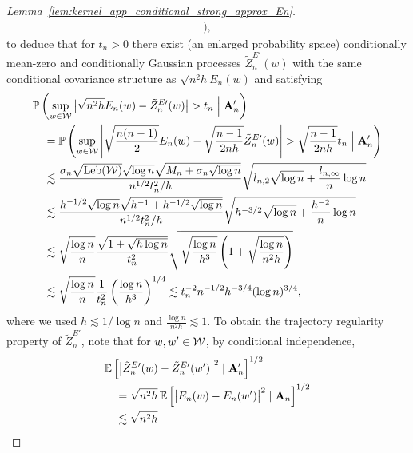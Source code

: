 \begin{proof}[Lemma~\ref{lem:kernel_app_conditional_strong_approx_En}]
\begin{align*}
    \Big),
  \end{align*}
  to deduce that for $t_n > 0$ there exist
  (an enlarged probability space)
  conditionally mean-zero
  and conditionally Gaussian processes
  $\tilde Z_n^{E\prime}(w)$
  with the same conditional covariance structure as
  $\sqrt{n^2 h} E_n(w)$ and
  satisfying
  \begin{align*}
    &\mathbb{P}\left(
      \sup_{w \in \mathcal{W}}
      \big|
      \sqrt{n^2h} E_n(w) - \tilde Z_n^{E\prime}(w)
      \big|
      > t_n
      \Bigm\vert \mathbf{A}_n'
    \right) \\
    &\quad=
    \mathbb{P}\left(
      \sup_{w \in \mathcal{W}}
      \left|
      \sqrt{\frac{n(n-1)}{2}} E_n(w)
      - \sqrt{\frac{n-1}{2 n h}} \tilde Z_n^{E\prime}(w)
      \right|
      > \sqrt{\frac{n-1}{2 n h}}
      t_n
      \Bigm\vert \mathbf{A}_n'
    \right) \\
    &\quad\lesssim
    \frac{
      \sigma_n
      \sqrt{\operatorname{Leb}(\mathcal{W})}
      \sqrt{\log n}
      \sqrt{M_n + \sigma_n\sqrt{\log n}}
    }{n^{1/2} t_n^2 / h}
    \sqrt{
      l_{n,2}
      \sqrt{\log n}
      + \frac{l_{n,\infty}}{n}
    \log n} \\
    &\quad\lesssim
    \frac{
      h^{-1/2}
      \sqrt{\log n}
      \sqrt{h^{-1} + h^{-1/2} \sqrt{\log n}}
    }{n^{1/2} t_n^2 / h}
    \sqrt{
      h^{-3/2}
      \sqrt{\log n}
      + \frac{h^{-2}}{n}
    \log n} \\
    &\quad\lesssim
    \sqrt{\frac{\log n}{n}}
    \frac{
      \sqrt{1 + \sqrt{h \log n}}
    }{t_n^2}
    \sqrt{
      \sqrt{\frac{\log n}{h^3}}
      \left( 1 + \sqrt{\frac{\log n}{n^2 h}} \right)
    } \\
    &\quad\lesssim
    \sqrt{\frac{\log n}{n}}
    \frac{ 1 }{t_n^2}
    \left(
      \frac{\log n}{h^3}
    \right)^{1/4}
    \lesssim
    t_n^{-2}
    n^{-1/2}
    h^{-3/4}
    (\log n)^{3/4},
  \end{align*}
  where we used
  $h \lesssim 1 / \log n$
  and $\frac{\log n}{n^2 h} \lesssim 1$.
  To obtain the trajectory regularity property of
  $\tilde Z_n^{E\prime}$,
  note that
  for $w, w' \in \mathcal{W}$,
  by conditional independence,
  \begin{align*}
    &\E\left[
      \big|
      \tilde Z_n^{E\prime}(w)
      - \tilde Z_n^{E\prime}(w')
      \big|^2
      \mid \bA_n'
    \right]^{1/2} \\
    &\quad=
    \sqrt{n^2h} \,
    \E\left[
      \big|
      E_n(w)
      - E_n(w')
      \big|^2
      \mid \bA_n
    \right]^{1/2} \\
    &\quad\lesssim
    \sqrt{n^2h} \,

\end{align*}
\end{proof}

